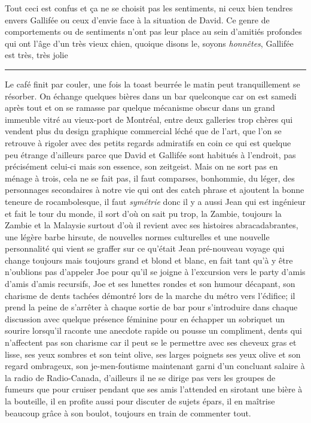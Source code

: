 \documentclass{article}
\begin{document}
Tout ceci est confus et ça ne se choisit pas les sentiments, ni ceux bien
tendres envers Gallifée ou ceux d'envie face à la situation de David. Ce
genre de comportements ou de sentiments n'ont pas leur place au sein
d'amitiés profondes qui ont l'âge d'un très vieux chien, quoique disons le,
soyons \emph{honnêtes}, Gallifée est très, très jolie\\


\begin{center}\noindent\rule{0.5\textwidth}{0.4pt}\end{center}


Le café finit par couler, une fois la toast beurrée le matin peut tranquillement
se résorber. On échange quelques bières dans un bar quelconque car on est samedi
après tout et on se ramasse par quelque mécanisme obscur dans un grand immeuble
vitré au vieux-port de Montréal, entre deux galleries trop chères qui vendent
plus du design graphique commercial léché que de l'art, que l'on se retrouve à
rigoler avec des petits regards admiratifs en coin ce qui est quelque peu
étrange d'ailleurs parce que David et Gallifée sont habitués à l'endroit, pas
précisément celui-ci mais son essence, son zeitgeist. Mais on ne sort pas en
ménage à trois, cela ne se fait pas, il faut comparses, bonhommie, du léger, des
personnages secondaires à notre vie qui ont des catch phrase et ajoutent la
bonne teneure de rocambolesque, il faut \emph{symétrie} donc il y a aussi Jean
qui est ingénieur et fait le tour du monde, il sort d'où on sait pu trop, la
Zambie, toujours la Zambie et la Malaysie surtout d'où il revient avec ses
histoires abracadabrantes, une légère barbe hirsute, de nouvelles normes
culturelles et une nouvelle personnalité qui vient se graffer sur ce qu'était
Jean pré-nouveau voyage qui change toujours mais toujours grand et blond et
blanc, en fait tant qu'à y être n'oublions pas d'appeler Joe pour qu'il se
joigne à l'excursion vers le party d'amis d'amis d'amis recursifs, Joe et ses
lunettes rondes et son humour décapant, son charisme de dents tachées démontré
lors de la marche du métro vers l'édifice; il prend la peine de s'arrêter à
chaque sortie de bar pour s'introduire dans chaque discussion avec quelque
présence féminine pour en échapper un sobriquet un sourire lorsqu'il raconte une
anecdote rapide ou pousse un compliment, dents qui n'affectent pas son charisme
car il peut se le permettre avec ses cheveux gras et lisse, ses yeux sombres et
son teint olive, ses larges poignets ses yeux olive et son regard ombrageux, son
je-men-foutisme maintenant garni d'un concluant salaire à la radio de
Radio-Canada, d'ailleurs il ne se dirige pas vers les groupes de fumeurs que
pour cruiser pendant que ses amis l'attended en sirotant une bière à la
bouteille, il en profite aussi pour discuter de sujets épars, il en maîtrise
beaucoup grâce à son boulot, toujours en train de commenter tout.\\
\end{document}

